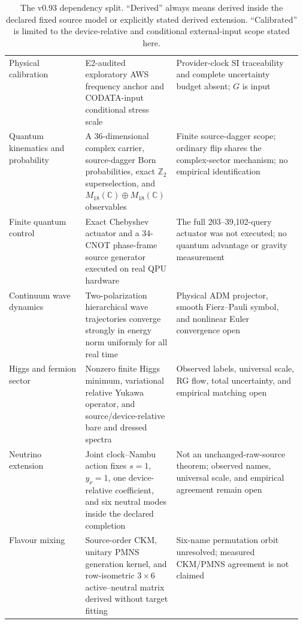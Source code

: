 \documentclass[11pt]{article}
\theoremstyle{definition}
\theoremstyle{remark}
\begin{document}
\begin{table}[ht]
\begin{tabularx}{\linewidth}{>{\raggedright\arraybackslash}p{0.26\linewidth} >{\raggedright\arraybackslash}p{0.31\linewidth} X}
Physical calibration & E2-audited exploratory AWS frequency anchor and CODATA-input conditional stress scale & Provider-clock SI traceability and complete uncertainty budget absent; $G$ is input \\
Quantum kinematics and probability & A 36-dimensional complex carrier, source-dagger Born probabilities, exact $\mathbb Z_2$ superselection, and $M_{18}(\mathbb C)\oplus M_{18}(\mathbb C)$ observables & Finite source-dagger scope; ordinary flip shares the complex-sector mechanism; no empirical identification \\
Finite quantum control & Exact Chebyshev actuator and a 34-CNOT phase-frame source generator executed on real QPU hardware & The full 203--39,102-query actuator was not executed; no quantum advantage or gravity measurement \\
Continuum wave dynamics & Two-polarization hierarchical wave trajectories converge strongly in energy norm uniformly for all real time & Physical ADM projector, smooth Fierz--Pauli symbol, and nonlinear Euler convergence open \\
Higgs and fermion sector & Nonzero finite Higgs minimum, variational relative Yukawa operator, and source/device-relative bare and dressed spectra & Observed labels, universal scale, RG flow, total uncertainty, and empirical matching open \\
Neutrino extension & Joint clock--Nambu action fixes $s=1$, $y_\nu=1$, one device-relative coefficient, and six neutral modes inside the declared completion & Not an unchanged-raw-source theorem; observed names, universal scale, and empirical agreement remain open \\
Flavour mixing & Source-order CKM, unitary PMNS generation kernel, and row-isometric $3\times6$ active--neutral matrix derived without target fitting & Six-name permutation orbit unresolved; measured CKM/PMNS agreement is not claimed \\
\bottomrule
\end{tabularx}
\caption{The v0.93 dependency split. ``Derived'' always means derived inside the declared fixed source model or explicitly stated derived extension. ``Calibrated'' is limited to the device-relative and conditional external-input scope stated here.}
\label{tab:delta}
\end{table}
\end{document}
